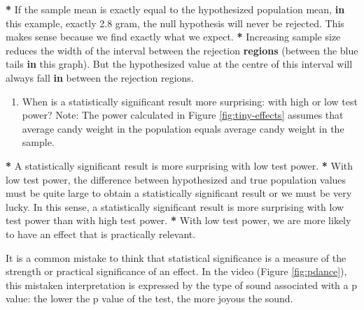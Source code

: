 \documentclass[a4paper]{book}
\newenvironment{Shaded}{\begin{snugshade}}{\end{snugshade}}
\newcommand{\KeywordTok}[1]{\textcolor[rgb]{0,0,0}{\textbf{#1}}}
\newcommand{\FloatTok}[1]{\textcolor[rgb]{0.00,0.00,0.00}{#1}}
\newcommand{\StringTok}[1]{\textcolor[rgb]{0.00,0.00,0.00}{#1}}
\newcommand{\ControlFlowTok}[1]{\textcolor[rgb]{0.00,0.00,0.00}{\textbf{#1}}}
\newcommand{\OperatorTok}[1]{\textcolor[rgb]{0.00,0.00,0.00}{\textbf{#1}}}
\newcommand{\NormalTok}[1]{#1}
\providecommand{\tightlist}{%
  \setlength{\itemsep}{0pt}\setlength{\parskip}{0pt}}
\theoremstyle{definition}
\theoremstyle{definition}
\theoremstyle{definition}
\theoremstyle{remark}
\begin{document}
\begin{Shaded}
\begin{Highlighting}[]
\OperatorTok{*}\StringTok{ }\NormalTok{If the sample mean is exactly equal to the hypothesized population mean, }\ControlFlowTok{in}
\NormalTok{this example, exactly }\FloatTok{2.8}\NormalTok{ gram, the null hypothesis will never be rejected.}
\NormalTok{This makes sense because we find exactly what we expect.}
\OperatorTok{*}\StringTok{ }\NormalTok{Increasing sample size reduces the width of the interval between the}
\NormalTok{rejection }\KeywordTok{regions}\NormalTok{ (between the blue tails }\ControlFlowTok{in}\NormalTok{ this graph). But the hypothesized}
\NormalTok{value at the centre of this interval will always fall }\ControlFlowTok{in}\NormalTok{ between the rejection}
\NormalTok{regions.}
\end{Highlighting}
\end{Shaded}

\begin{enumerate}
\def\labelenumi{\arabic{enumi}.}
\setcounter{enumi}{4}
\tightlist
\item
  When is a statistically significant result more surprising: with high
  or low test power? Note: The power calculated in Figure
  \ref{fig:tiny-effects} assumes that average candy weight in the
  population equals average candy weight in the sample.
\end{enumerate}

\begin{Shaded}
\begin{Highlighting}[]
\OperatorTok{*}\StringTok{ }\NormalTok{A statistically significant result is more surprising with low test power.}
\OperatorTok{*}\StringTok{ }\NormalTok{With low test power, the difference between hypothesized and true population}
\NormalTok{values must be quite large to obtain a statistically significant result or we}
\NormalTok{must be very lucky. In this sense, a statistically significant result is more}
\NormalTok{surprising with low test power than with high test power.}
\OperatorTok{*}\StringTok{ }\NormalTok{With low test power, we are more likely to have an effect that is}
\NormalTok{practically relevant.}
\end{Highlighting}
\end{Shaded}

It is a common mistake to think that statistical significance is a
measure of the strength or practical significance of an effect. In the
video (Figure \ref{fig:pdance}), this mistaken interpretation is
expressed by the type of sound associated with a p value: the lower the
p value of the test, the more joyous the sound.
\end{document}
